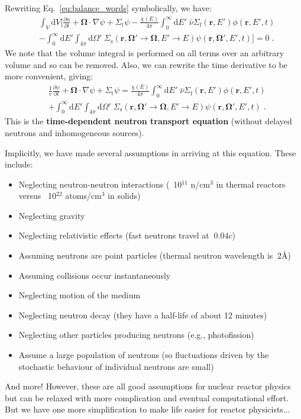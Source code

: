 \documentclass{article}
\begin{document}
Rewriting Eq.~\eqref{eq:balance_words} symbolically, we have:
\begin{equation}
\begin{split}
    &\int_V\mathrm{d}V\Bigg[\frac{\partial n}{\partial t}  +\mathbf{\Omega}\cdot\nabla\psi + \Sigma_\mathrm{t}\psi
    -\frac{\chi(E)}{4\pi}\int^\infty_0 \mathrm{d}E' \;\bar{\nu}\Sigma_\mathrm{f}(\mathbf{r},E')\phi(\mathbf{r},E',t) \\
    &-\int^\infty_0 \mathrm{d}E'\int_{4\pi}\mathrm{d}{\Omega}' \;\Sigma_\mathrm{s}\left(\mathbf{r},\mathbf{\Omega}'\rightarrow\mathbf{\Omega},E'\rightarrow E\right)\psi(\mathbf{r},\mathbf{\Omega}',E',t)\Bigg] = 0\;\mathrm{.}
\end{split}
\end{equation}
We note that the volume integral is performed on all terms over an arbitrary volume and so can be removed. Also, we can rewrite the time derivative to be more convenient, giving:
\begin{equation}
\begin{split}
    &\frac{1}{v}\frac{\partial \psi}{\partial t}  +\mathbf{\Omega}\cdot\nabla\psi + \Sigma_\mathrm{t}\psi
    =\frac{\chi(E)}{4\pi}\int^\infty_0 \mathrm{d}E' \;\bar{\nu}\Sigma_\mathrm{f}(\mathbf{r},E')\phi(\mathbf{r},E',t) \\
    &+\int^\infty_0 \mathrm{d}E'\int_{4\pi}\mathrm{d}{\Omega}' \;\Sigma_\mathrm{s}\left(\mathbf{r},\mathbf{\Omega}'\rightarrow\mathbf{\Omega},E'\rightarrow E\right)\psi(\mathbf{r},\mathbf{\Omega}',E',t)\;\mathrm{.}
    \end{split}
\end{equation}
This is the \textbf{time-dependent neutron transport equation} (without delayed neutrons and inhomogeneous sources).

Implicitly, we have made several assumptions in arriving at this equation. These include:
\begin{itemize}
    \item Neglecting neutron-neutron interactions (~10$^{11}$ n/cm$^3$ in thermal reactors versus ~10$^{22}$ atoms/cm$^3$ in solids)
    \item Neglecting gravity
    \item Neglecting relativistic effects (fast neutrons travel at $~0.04c$)
    \item Assuming neutrons are point particles (thermal neutron wavelength is $~2$\AA)
    \item Assuming collisions occur instantaneously
    \item Neglecting motion of the medium
    \item Neglecting neutron decay (they have a half-life of about 12 minutes)
    \item Neglecting other particles producing neutrons (e.g., photofission)
    \item Assume a large population of neutrons (so fluctuations driven by the stochastic behaviour of individual neutrons are small)
\end{itemize}
And more! However, these are all good assumptions for nuclear reactor physics but can be relaxed with more complication and eventual computational effort. But we have one more simplification to make life easier for reactor physicists...
\end{document}
